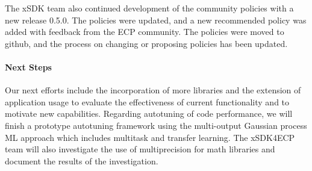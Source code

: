 The xSDK team also continued development of the community policies with a new release 0.5.0. The policies were updated, and a new recommended policy was added with feedback from the ECP community. The policies were moved to github, and the process on changing or proposing policies has been updated.

\paragraph{Next Steps}

Our next efforts include the incorporation of more libraries and the extension of application usage to evaluate the effectiveness of current functionality and to motivate new capabilities. Regarding autotuning of code performance, we will finish a prototype autotuning framework using the multi-output Gaussian process ML approach which includes multitask and transfer learning. The xSDK4ECP team will also investigate the use of multiprecision for math libraries and document the results of the investigation.

